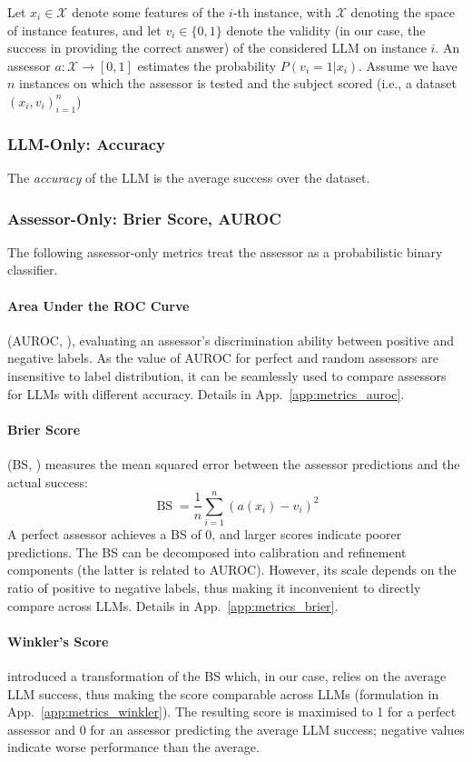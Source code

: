 \documentclass[11pt]{article}
\begin{document}
Let $x_i\in \mathcal X$ denote some features of the $i$-th instance, with $\mathcal{X}$ denoting the space of instance features, and let $v_{i}\in\{0,1\}$ denote the validity (in our case, the success in providing the correct answer) of the considered LLM on instance $i$. %
An assessor $a: \mathcal{X} \to [0,1] $ estimates the probability $P(v_{i}=1|x_i)$. Assume we have $n$ instances on which the assessor is tested and the subject scored (i.e., a dataset \((x_i, v_{i})_{i=1}^n\))

\subsubsection{LLM-Only: Accuracy}
\label{subsubsec:subject_accuracy}
The \textit{accuracy} of the LLM is the average success over the dataset.

\subsubsection{Assessor-Only: Brier Score, AUROC}
\label{subsubsec:assessor_metrics}
The following assessor-only metrics treat the assessor as a probabilistic binary classifier.

\paragraph{Area Under the ROC Curve} (AUROC, \citealp{bradley1997use}), %
    evaluating an assessor's discrimination ability between positive and negative labels. 
    As the value of AUROC for perfect and random assessors are insensitive to label distribution, it can be seamlessly used to compare assessors for LLMs with different accuracy. Details in App.~\ref{app:metrics_auroc}. 
\paragraph{Brier Score} (BS, \citealp{gneiting2007strictly}) measures the mean squared error between the assessor predictions and the actual success:%
    \[
    \operatorname{BS} = 
    \frac{1}{n} \sum_{i=1}^n \left(a(x_i) - v_{i}\right)^2
    \]%
    A perfect assessor achieves a BS of 0, and larger scores indicate poorer predictions. 
    The BS can be decomposed into calibration and refinement  components (the latter is related to AUROC). However, its scale depends on the ratio of positive to negative labels, thus making it inconvenient to directly compare across LLMs. Details in App.~\ref{app:metrics_brier}. 
\paragraph{Winkler's Score} \citet{winkler} introduced a transformation of the BS which, in our case, relies on the average LLM success, thus making the score comparable across LLMs (formulation in App.~\ref{app:metrics_winkler}). The resulting score is maximised to 1 for a perfect assessor and 0 for an assessor predicting the average LLM success; negative values indicate worse performance than the average. 
    
\end{document}
